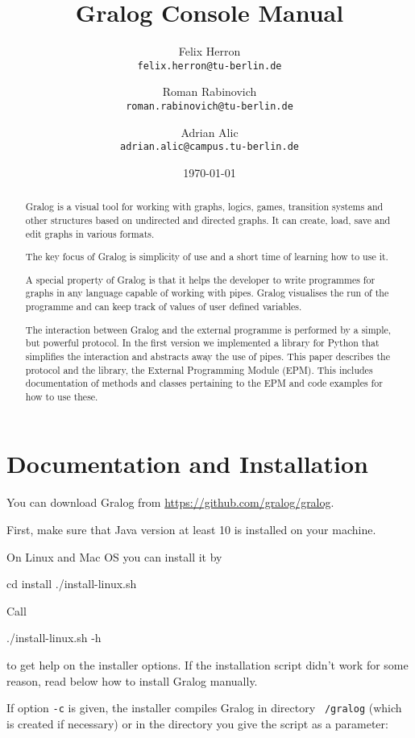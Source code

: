 \documentclass{article}
\title{Gralog Console Manual}
\author{Felix Herron\\\texttt{felix.herron@tu-berlin.de}
  \and Roman Rabinovich\\ \texttt{roman.rabinovich@tu-berlin.de}
\and Adrian Alic\\ \texttt{adrian.alic@campus.tu-berlin.de}}
\date{\today}
\newcounter{example}
\begin{document}
\maketitle


\begin{abstract}
Gralog is a visual tool for working with graphs, logics, games,
transition systems and other structures based on undirected and
directed graphs. It can create, load, save and edit graphs in
various formats.

The key focus of Gralog is simplicity of use and a short time of
learning how to use it.

A special property of Gralog is that it helps the developer to write
programmes for graphs in any language capable of working with
pipes. Gralog visualises the run of the programme and can keep track
of values of user defined variables.

The interaction between Gralog and the external programme is
performed by a simple, but powerful protocol. In the first version
we implemented a library for Python that simplifies the interaction
and abstracts away the use of pipes. This paper describes the
protocol and the library, the External Programming Module (EPM). This
includes documentation of methods and classes pertaining to the
EPM and code examples for how to use these.
\end{abstract}

\section{Documentation and Installation}

You can download Gralog from \url{https://github.com/gralog/gralog}.

First, make sure that Java version at least 10 is installed on your
machine.

On Linux and Mac OS you can install it by

\begin{tcolorbox}
  cd install
  ./install-linux.sh
\end{tcolorbox}

Call
\begin{tcolorbox}
  ./install-linux.sh -h
\end{tcolorbox}
to get help on the installer options. If the installation script
didn't work for some reason, read below how to install Gralog manually.

If option \texttt{-c} is given, the installer compiles Gralog in
directory \texttt{~/gralog} (which is created if necessary) or in the directory you give the script as a parameter:
\end{document}
